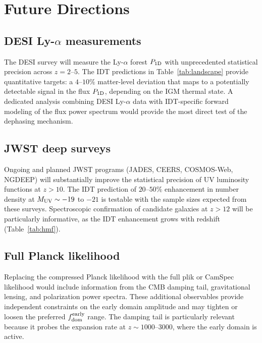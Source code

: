 \documentclass[aps,prd,twocolumn,superscriptaddress,nofootinbib]{revtex4-2}
\newcommand{\fdom}{f_{\rm dom}}
\begin{document}
\section{Future Directions}
\label{sec:future}

\subsection{DESI Ly-$\alpha$ measurements}
\label{sec:future_desi}

The DESI survey will measure the Ly-$\alpha$ forest $P_{1{\rm D}}$
with unprecedented statistical precision across $z = 2$--$5$. The
IDT predictions in Table~\ref{tab:landscape} provide quantitative
targets: a $4$--$10\%$ matter-level deviation that maps to a
potentially detectable signal in the flux $P_{1{\rm D}}$, depending
on the IGM thermal state. A dedicated analysis combining DESI
Ly-$\alpha$ data with IDT-specific forward modeling of the flux
power spectrum would provide the most direct test of the dephasing
mechanism.

\subsection{JWST deep surveys}
\label{sec:future_jwst}

Ongoing and planned JWST programs (JADES, CEERS, COSMOS-Web, NGDEEP)
will substantially improve the statistical precision of UV luminosity
functions at $z > 10$. The IDT prediction of $20$--$50\%$
enhancement in number density at $M_{\rm UV} \sim -19$ to $-21$ is
testable with the sample sizes expected from these surveys.
Spectroscopic confirmation of candidate galaxies at $z > 12$ will be
particularly informative, as the IDT enhancement grows with redshift
(Table~\ref{tab:hmf}).

\subsection{Full Planck likelihood}
\label{sec:future_planck}

Replacing the compressed Planck likelihood with the full plik or
CamSpec likelihood would include information from the CMB damping
tail, gravitational lensing, and polarization power spectra. These
additional observables provide independent constraints on the early
domain amplitude and may tighten or loosen the preferred
$\fdom^{\rm early}$ range. The damping tail is particularly relevant
because it probes the expansion rate at $z \sim 1000$--$3000$, where
the early domain is active.
\end{document}
